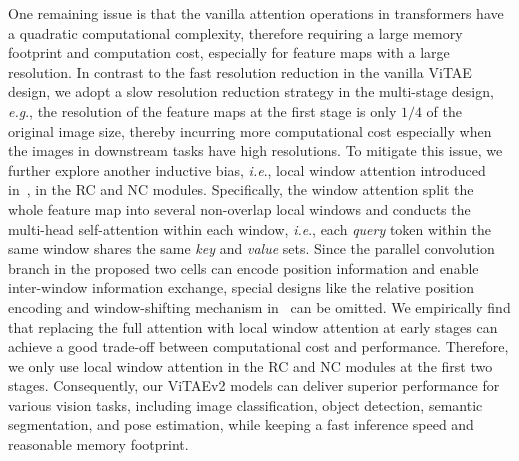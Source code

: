 \documentclass[twocolumn]{svjour3}          \smartqed  \usepackage{natbib}
\newcommand{\ie}{i.e}
\newcommand{\eg}{e.g}
\def\onedot{.\xspace}
\def\eg{\emph{e.g}\onedot}
\def\ie{\emph{i.e}\onedot}
\begin{document}
One remaining issue is that the vanilla attention operations in transformers have a quadratic computational complexity, therefore requiring a large memory footprint and computation cost, especially for feature maps with a large resolution. In contrast to the fast resolution reduction in the vanilla ViTAE design, we adopt a slow resolution reduction strategy in the multi-stage design, \eg, the resolution of the feature maps at the first stage is only $1/4$ of the original image size, thereby incurring more computational cost especially when the images in downstream tasks have high resolutions. To mitigate this issue, we further explore another inductive bias, \ie, local window attention introduced in~\citep{liu2021swin}, in the RC and NC modules. Specifically, the window attention split the whole feature map into several non-overlap local windows and conducts the multi-head self-attention within each window, \ie, each \textit{query} token within the same window shares the same \textit{key} and \textit{value} sets. Since the parallel convolution branch in the proposed two cells can encode position information and enable inter-window information exchange, special designs like the relative position encoding and window-shifting mechanism in~\citep{liu2021swin} can be omitted. We empirically find that replacing the full attention with local window attention at early stages can achieve a good trade-off between computational cost and performance. Therefore, we only use local window attention in the RC and NC modules at the first two stages. Consequently, our ViTAEv2 models can deliver superior performance for various vision tasks, including image classification, object detection, semantic segmentation, and pose estimation, while keeping a fast inference speed and reasonable memory footprint.
\end{document}
